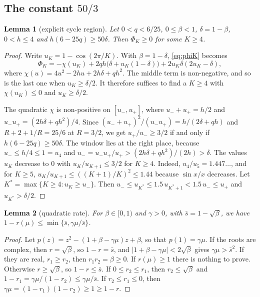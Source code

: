 \documentclass[11pt, a4paper]{article}
\newtheorem{lemma}{Lemma}
\theoremstyle{definition}
\begin{document}
\subsection{The constant \texorpdfstring{$50/3$}{50/3}}

\begin{lemma}[explicit cycle region]
  \label{lem:window1d}
  Let $0<q<6/25$, $0\le\beta<1$, $\delta=1-\beta$, $0<h\le4$ and $h(6-25q)\ge50\delta$. Then $\Phi_K\ge0$ for some
  $K\ge4$.
\end{lemma}

\begin{proof}
  Write $u_K=1-\cos(2\pi/K)$. With $\beta=1-\delta$, \eqref{eq:phiK} becomes
  \begin{equation}
    \Phi_K=-\chi(u_K)+2qh\bigl(\delta+u_K(1-\delta)\bigr)+2u_K\delta(2u_K-\delta),
    \label{eq:phi-expansion}
  \end{equation}
  where $\chi(u)=4u^2-2hu+2h\delta+qh^2$.
  The middle term is non-negative, and so is the last one when $u_K\ge\delta/2$. It therefore suffices to find a $K\ge4$
  with $\chi(u_K)\le0$ and $u_K\ge\delta/2$.

  The quadratic $\chi$ is non-positive on $[u_-,u_+]$, where $u_-+u_+=h/2$ and $u_-u_+=(2h\delta+qh^2)/4$. Since
  $(u_-+u_+)^2/(u_-u_+)=h/(2\delta+qh)$ and $R+2+1/R=25/6$ at $R=3/2$, we get $u_+/u_-\ge3/2$ if and only if
  $h(6-25q)\ge50\delta$. The window lies at the right place, because $u_-\le h/4\le1=u_4$ and
  $u_-=u_-u_+/u_+>(2h\delta+qh^2)/(2h)>\delta$. The values $u_K$ decrease to $0$ with $u_K/u_{K+1}\le3/2$ for
  $K\ge4$. Indeed, $u_4/u_5=1.447\ldots$, and for $K\ge5$, $u_K/u_{K+1}\le((K+1)/K)^2\le1.44$ because $\sin x/x$
  decreases. Let $K^\ast=\max\{K\ge4:u_K\ge u_-\}$. Then $u_-\le u_{K^\ast}\le1.5\,u_{K^\ast+1}<1.5\,u_-\le u_+$ and
  $u_{K^\ast}>\delta/2$.
\end{proof}

\begin{lemma}[quadratic rate]
  \label{lem:quad}
  For $\beta\in[0,1)$ and $\gamma>0$, with $\bar s=1-\sqrt\beta$, we have $1-r(\mu)\le\min\{\bar s,\gamma\mu/\bar s\}$.
\end{lemma}

\begin{proof}
  Let $p(z)=z^2-(1+\beta-\gamma\mu)z+\beta$, so that $p(1)=\gamma\mu$. If the roots are complex, then $r=\sqrt\beta$, so
  $1-r=\bar s$, and $|1+\beta-\gamma\mu|<2\sqrt\beta$ gives $\gamma\mu>\bar s^2$. If they are real, $r_1\ge r_2$, then
  $r_1r_2=\beta\ge0$. If $r(\mu)\ge1$ there is nothing to prove. Otherwise $r\ge\sqrt\beta$, so $1-r\le\bar s$. If
  $0\le r_2\le r_1$, then $r_2\le\sqrt\beta$ and $1-r_1=\gamma\mu/(1-r_2)\le\gamma\mu/\bar s$. If $r_2\le r_1\le0$, then
  $\gamma\mu=(1-r_1)(1-r_2)\ge1\ge1-r$.
\end{proof}
\end{document}
